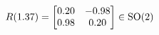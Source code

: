 \documentclass[preview]{standalone}
\begin{document}
\begin{align*}
\special{dvisvgm:raw <g id='unique000'>}R(1.37) = \begin{bmatrix} 0.20 & -0.98 \\ 0.98 & 0.20 \end{bmatrix} \in \text{SO}(2)\special{dvisvgm:raw </g>}
\end{align*}
\end{document}
